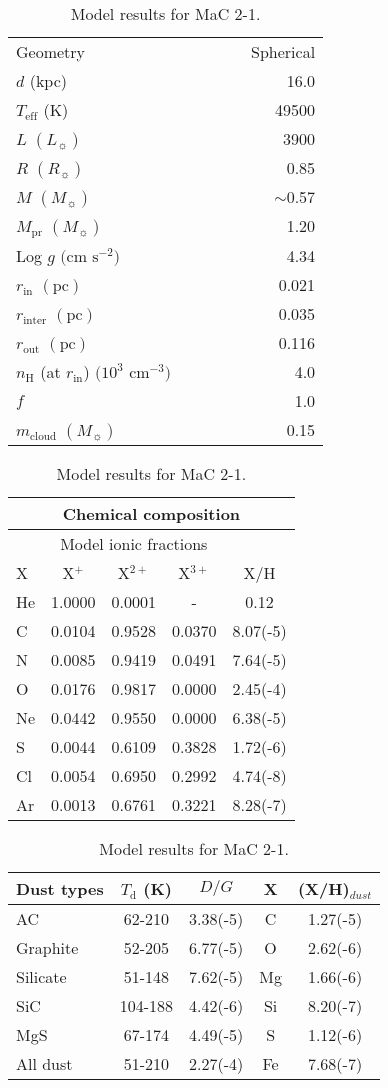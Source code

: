 \documentclass[a4paper,fleqn,usenatbib]{mnras}
\begin{document}
\begin{table}
\centering
\small
\caption{Model results for MaC 2-1. \label{tab:pimodelmac2-1}}
\begin{tabular}{l c c c c r}
\hline
Geometry &&&&& Spherical\\
$d$ (kpc) &&&&& 16.0\\
$T_\mathrm{eff}$ (K) &&&&& 49500\\
$L$ $(L_{\sun})$ &&&&& 3900\\
$R$ $(R_{\sun})$ &&&&& 0.85\\
$M$ $(M_{\sun})$ &&&&& $\sim$0.57\\
$M_\mathrm{pr}$ $(M_{\sun})$ &&&&& 1.20\\
Log $g$ $(\mathrm{cm}$ $\mathrm{s^{-2}})$ &&&&& 4.34\\
$r_\mathrm{in}$ $(\mathrm{pc})$ &&&&& 0.021\\
$r_\mathrm{inter}$ $(\mathrm{pc})$ &&&&& 0.035\\
$r_\mathrm{out}$ $(\mathrm{pc})$ &&&&& 0.116\\
$n_\mathrm{H}$ (at $r_\mathrm{in}$) $(10^3$ $\mathrm{cm^{-3}})$ &&&&& 4.0 \\
$f$ &&&&& 1.0\\
$m_\mathrm{cloud}$ $(M_{\sun})$ &&&&& 0.15\\
\hline
\hline
\end{tabular}
\begin{tabular}{l c c c c}
\multicolumn{5}{c}{Chemical composition}\\
\hline
& \multicolumn{3}{c}{Model ionic fractions} &\\
X & X$^{+}$ & X$^{2+}$ & X$^{3+}$ & X/H \\
\hline
He	&	1.0000	&	0.0001	&	-	&	0.12	\\
C	&	0.0104	&	0.9528	&	0.0370	&	8.07(-5)\\
N	&	0.0085	&	0.9419	&	0.0491	&	7.64(-5)	\\
O	&	0.0176	&	0.9817	&	0.0000  &	2.45(-4)	\\
Ne	&	0.0442	&	0.9550	&	0.0000	&	6.38(-5)	\\
S	&	0.0044	&	0.6109	&	0.3828	&	1.72(-6)	\\
Cl	&	0.0054	&	0.6950	&	0.2992	&	4.74(-8)	\\
Ar	&	0.0013	&	0.6761	&	0.3221	&	8.28(-7)\\
\end{tabular}
\begin{tabular}{l c c c c}
\hline
Dust types & $T_\mathrm{d}$ (K) & $D/G$ & X & (X/H)$_{dust}$\\
\hline
AC & 62-210 & 3.38(-5) & C & 1.27(-5)\\
Graphite & 52-205 & 6.77(-5) & O & 2.62(-6)\\
Silicate & 51-148 & 7.62(-5) & Mg & 1.66(-6)\\
SiC & 104-188 & 4.42(-6) & Si & 8.20(-7)\\
MgS & 67-174 & 4.49(-5) & S & 1.12(-6)\\
All dust & 51-210 & 2.27(-4) & Fe & 7.68(-7) \\
\hline
\end{tabular}
\end{table} 
\end{document}
